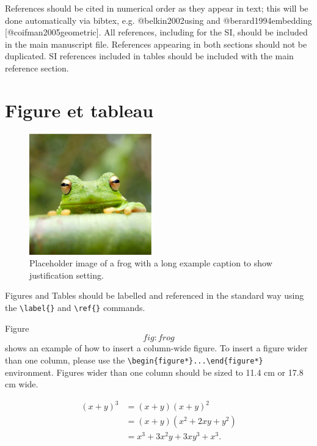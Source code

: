 \documentclass[9pt,twocolumn,twoside,]{pnas-new}
\begin{document}
References should be cited in numerical order as they appear in text;
this will be done automatically via bibtex, e.g. @belkin2002using and
@berard1994embedding {[}@coifman2005geometric{]}. All references,
including for the SI, should be included in the main manuscript file.
References appearing in both sections should not be duplicated. SI
references included in tables should be included with the main reference
section.

\hypertarget{figure-et-tableau}{%
\section{Figure et tableau}\label{figure-et-tableau}}

\begin{figure}
\centering
\includegraphics{frog.png}
\caption{Placeholder image of a frog with a long example caption to show
justification setting.{}}
\end{figure}

Figures and Tables should be labelled and referenced in the standard way
using the \texttt{\textbackslash{}label\{\}} and
\texttt{\textbackslash{}ref\{\}} commands.

Figure \[fig:frog\] shows an example of how to insert a column-wide
figure. To insert a figure wider than one column, please use the
\texttt{\textbackslash{}begin\{figure*\}...\textbackslash{}end\{figure*\}}
environment. Figures wider than one column should be sized to 11.4 cm or
17.8 cm wide.

\[\begin{aligned}
(x+y)^3&=(x+y)(x+y)^2\\
       &=(x+y)(x^2+2xy+y^2) \label{eqn:example} \\
       &=x^3+3x^2y+3xy^3+x^3. 
\end{aligned}\]



% 
\end{document}
